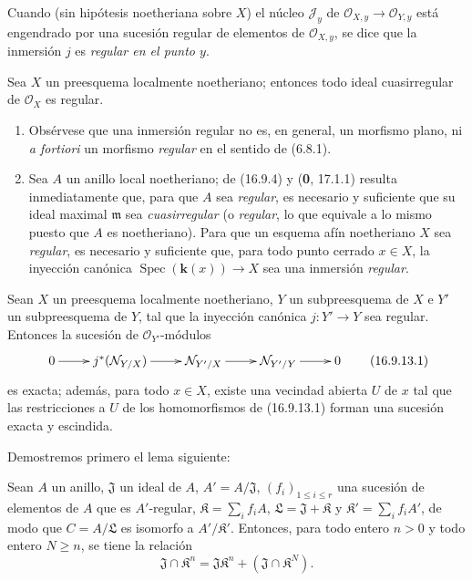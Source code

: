 Cuando (sin hipótesis noetheriana sobre $X$) el núcleo $\mathscr J_y$ de
$\mathcal{O}_{X,y}\to\mathcal{O}_{Y,y}$ está engendrado por una sucesión
regular de elementos de $\mathcal{O}_{X,y}$, se dice que la inmersión $j$ es
\emph{regular en el punto $y$}.

\begin{corollary}[16.9.11]
\label{IV.16.9.11}
Sea $X$ un preesquema localmente noetheriano; entonces todo ideal
cuasirregular de $\mathcal{O}_X$ es regular.
\end{corollary}

\begin{remarks}[16.9.12]
\label{IV.16.9.12}
\begin{enumerate}
  \item[(i)] Obsérvese que una inmersión regular no es, en general, un
  morfismo plano, ni \emph{a fortiori} un morfismo \emph{regular} en el sentido
  de (6.8.1).
  \item[(ii)] Sea $A$ un anillo local noetheriano; de (16.9.4) y (\textbf 0, 17.1.1)
  resulta inmediatamente que, para que $A$ sea \emph{regular}, es necesario y
  suficiente que su ideal maximal $\mathfrak{m}$ sea \emph{cuasirregular}
  (o \emph{regular}, lo que equivale a lo mismo puesto que $A$ es
  noetheriano). Para que un esquema afín noetheriano $X$ sea \emph{regular},
  es necesario y suficiente que, para todo punto cerrado $x\in X$, la
  inyección canónica $\operatorname{Spec}(\boldsymbol k(x))\to X$ sea una inmersión
  \emph{regular}.
\end{enumerate}
\end{remarks}

\begin{proposition}[16.9.13]
\label{IV.16.9.13}
Sean $X$ un preesquema localmente noetheriano, $Y$ un subpreesquema de $X$ e
$Y'$ un subpreesquema de $Y$, tal que la inyección canónica $j:Y'\to Y$ sea
regular. Entonces la sucesión de $\mathcal{O}_{Y'}$-módulos
\[
  \xymatrix{
    0\ar[r] & j^*(\mathcal{N}_{Y/X})\ar[r]
      & \mathcal{N}_{Y'/X}\ar[r] & \mathcal{N}_{Y'/Y}\ar[r] & 0
  }
  \tag{16.9.13.1}
  \label{IV.16.9.13.1}
\]
es exacta; además, para todo $x\in X$, existe una vecindad abierta $U$ de $x$
tal que las restricciones a $U$ de los homomorfismos de \textup{(16.9.13.1)} forman
una sucesión exacta y escindida.
\end{proposition}

Demostremos primero el lema siguiente:

\begin{lemma}[16.9.13.2]
\label{IV.16.9.13.2}
Sean $A$ un anillo, $\mathfrak J$ un ideal de $A$,
$A'=A/\mathfrak J$, $(f_i)_{1\leq i\leq r}$ una sucesión de elementos de
$A$ que es $A'$-regular, $\mathfrak{K}=\sum_i f_iA$,
$\mathfrak{L}=\mathfrak J+\mathfrak{K}$ y
$\mathfrak{K}'=\sum_i f_iA'$, de modo que $C=A/\mathfrak{L}$ es isomorfo a
$A'/\mathfrak{K}'$. Entonces, para todo entero $n>0$ y todo entero $N\geq n$,
se tiene la relación
\[
  \mathfrak J\cap\mathfrak{K}^n
  =\mathfrak J\mathfrak{K}^n+(\mathfrak J\cap\mathfrak{K}^N).
  \tag{16.9.13.3}
  \label{IV.16.9.13.3}
\]
\end{lemma}

